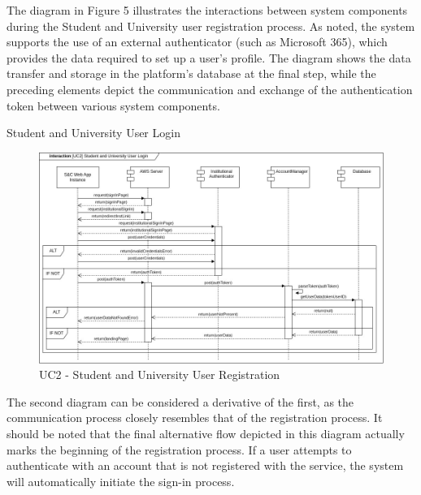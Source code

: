 \begin{enumerate}[label={[UC\arabic*]}]
    The diagram in Figure 5 illustrates the interactions between system components during the Student and University user registration process. As noted, the system supports the use of an external authenticator (such as Microsoft 365), which provides the data required to set up a user's profile. The diagram shows the data transfer and storage in the platform's database at the final step, while the preceding elements depict the communication and exchange of the authentication token between various system components.
    \newpage
    \item Student and University User Login
    \begin{figure}[h]
        \centering
        \includegraphics[width=1\linewidth]{DD-Latex//assets//Runtime View Diagrams/UC2.jpg}
        \caption{UC2 - Student and University User Registration}
        \label{fig:UC2}
    \end{figure}

    The second diagram can be considered a derivative of the first, as the communication process closely resembles that of the registration process. It should be noted that the final alternative flow depicted in this diagram actually marks the beginning of the registration process. If a user attempts to authenticate with an account that is not registered with the service, the system will automatically initiate the sign-in process.
    \newpage
    

\end{enumerate}

